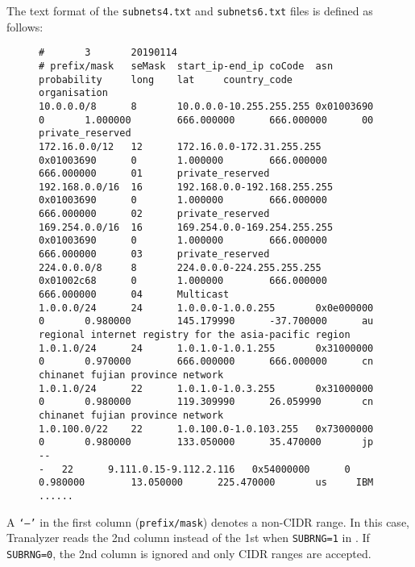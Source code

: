 \documentclass[documentation]{subfiles}
\begin{document}
The text format of the {\tt subnets4.txt} and {\tt subnets6.txt} files is defined as follows:
\begin{figure}[!ht]
\centering
\begin{small}
\begin{lstlisting}
#       3       20190114
# prefix/mask   seMask  start_ip-end_ip coCode  asn     probability     long    lat     country_code    organisation
10.0.0.0/8      8       10.0.0.0-10.255.255.255 0x01003690      0       1.000000        666.000000      666.000000      00      private_reserved
172.16.0.0/12   12      172.16.0.0-172.31.255.255       0x01003690      0       1.000000        666.000000      666.000000      01      private_reserved
192.168.0.0/16  16      192.168.0.0-192.168.255.255     0x01003690      0       1.000000        666.000000      666.000000      02      private_reserved
169.254.0.0/16  16      169.254.0.0-169.254.255.255     0x01003690      0       1.000000        666.000000      666.000000      03      private_reserved
224.0.0.0/8     8       224.0.0.0-224.255.255.255       0x01002c68      0       1.000000        666.000000      666.000000      04      Multicast
1.0.0.0/24      24      1.0.0.0-1.0.0.255       0x0e000000      0       0.980000        145.179990      -37.700000      au      regional internet registry for the asia-pacific region
1.0.1.0/24      24      1.0.1.0-1.0.1.255       0x31000000      0       0.970000        666.000000      666.000000      cn      chinanet fujian province network
1.0.1.0/24      22      1.0.1.0-1.0.3.255       0x31000000      0       0.980000        119.309990      26.059990       cn      chinanet fujian province network
1.0.100.0/22    22      1.0.100.0-1.0.103.255   0x73000000      0       0.980000        133.050000      35.470000       jp      --
-	22      9.111.0.15-9.112.2.116   0x54000000      0       0.980000        13.050000      225.470000       us     IBM
......
\end{lstlisting}
\end{small}
\end{figure}

A {\tt `--'} in the first column ({\tt prefix/mask}) denotes a non-CIDR range.
In this case, Tranalyzer reads the 2nd column instead of the 1st when {\tt SUBRNG=1} in .
If {\tt SUBRNG=0}, the 2nd column is ignored and only CIDR ranges are accepted.\\
\end{document}
